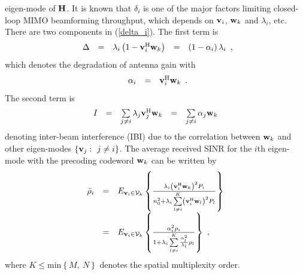 \documentclass[10pt,fleqn, twocolumn]{IEEEtran}
\newcommand{\bH}{{\bf H}}
\newcommand{\bv}{{\bf v}}
\newcommand{\bw}{{\bf w}}
\begin{document}
eigen-mode of $\bH$. It is known that $\delta_{i}$ is one of the
major factors limiting closed-loop MIMO beamforming throughput,
which depends on $\bv_{i}$, $\bw_{k}$ and $\lambda_{i}$, etc.
There are two components in (\ref{delta_i}). The first term is
\begin{equation}
\begin{array}{rcccl}
\Delta&=&\lambda_{i}\left(1-\bv_{i}^{\rm
H}\bw_k\right)&=&\left(1-\alpha_{i}\right)\lambda_{i}
\end{array},
\end{equation}
\noindent which denotes the degradation of antenna gain with
\begin{equation}
\begin{array}{rcl}
\alpha_{i}&=&\bv_{i}^{\rm H}\bw_k
\end{array}.\label{alpha}
\end{equation}
\noindent The second term is
\begin{equation}
\begin{array}{rcccl}
I_{} & = & \sum\limits_{j\neq i}\lambda_{j}\bv_{j}^{\rm
H}\bw_{k}&=&\sum\limits_{j\neq i}\alpha_{j}\bw_{k}
\end{array}\label{IBI}
\end{equation}
\noindent denoting inter-beam interference (IBI) due to the
correlation between $\bw_{k}$ and other eigen-modes
$\left\{\bv_{j}:\ j\neq i\right\}$. The average received SINR for
the $i$th eigen-mode with the precoding codeword $\bw_{k}$ can be
written by
\begin{equation}
\begin{array}{rcl}
\bar\rho_{i}&=&\mbox{E}_{\bv_{i}\in{\cal
V}_{k}}\left\{\frac{\lambda_{i}\left(\bv_{i}^{\rm
H}\bw_{k}\right)^2P_{i}}{n_{0}^2+ \lambda_{i}\sum\limits_{l\neq
i}^{K}\left(\bv_{i}^{\rm H}\bw_{l}\right)^{2}P_{l}}\right\}\\
&=&\mbox{E}_{\bv_{i}\in{\cal
V}_{k}}\left\{\frac{\alpha_{i}^{2}\rho_{i}}{1+
\lambda_{i}\sum\limits_{l\neq
i}^{K}\frac{\alpha_{l}^{2}}{\lambda_{l}}\rho_{l}}\right\}\ ,
\end{array}\label{bar_rho}
\end{equation}
\noindent where $K\leq\mbox{min}\left\{M,\ N\right\}$ denotes the
spatial multiplexity order.
\end{document}
